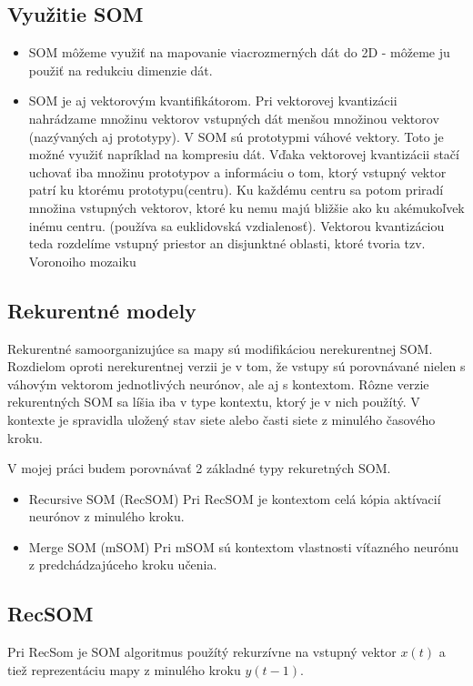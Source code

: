\subsection{Využitie SOM}
\begin{itemize}
\item SOM môžeme využiť na mapovanie viacrozmerných dát do 2D - môžeme ju použiť na redukciu dimenzie dát.
\item SOM je aj vektorovým kvantifikátorom. Pri vektorovej kvantizácii nahrádzame množinu vektorov vstupných dát menšou množinou vektorov (nazývaných aj prototypy). V SOM sú prototypmi
		váhové vektory. Toto je možné využiť napríklad na kompresiu dát. Vďaka vektorovej kvantizácii stačí uchovať iba množinu prototypov a informáciu o tom, ktorý vstupný vektor patrí 
		ku ktorému prototypu(centru). Ku každému centru sa potom priradí množina vstupných vektorov, ktoré ku nemu majú bližšie ako ku akémukoľvek inému centru. (používa sa euklidovská vzdialenosť).
		Vektorou kvantizáciou teda rozdelíme vstupný priestor an disjunktné oblasti, ktoré tvoria tzv. Voronoiho mozaiku
\end{itemize}


\subsection{Rekurentné modely}
Rekurentné samoorganizujúce sa mapy sú modifikáciou nerekurentnej SOM.
Rozdielom oproti nerekurentnej verzii je v tom, že vstupy sú porovnávané
nielen s váhovým vektorom jednotlivých neurónov, ale aj s kontextom.
Rôzne verzie rekurentných SOM sa líšia iba v type kontextu, ktorý je v nich použítý. 
V kontexte je spravidla uložený stav siete alebo časti siete z minulého časového kroku.

V mojej práci budem porovnávať 2 základné typy rekuretných SOM.

\begin{itemize}
	\item Recursive SOM (RecSOM)
	Pri RecSOM je kontextom celá kópia aktívacií neurónov z minulého kroku.
	\item Merge SOM (mSOM)
	Pri mSOM sú kontextom vlastnosti víťazného neurónu z predchádzajúceho kroku učenia.
\end{itemize}

\subsection{RecSOM}
Pri RecSom je SOM algoritmus použítý rekurzívne na vstupný vektor $x(t)$ a tiež reprezentáciu mapy
z minulého kroku $y(t-1)$. 

